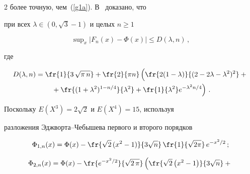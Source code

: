 \begin{multicols}{2}
более точную, чем~(\ref{g1a}). В~\cite{5-cr} доказано, что


при всех $\lambda \in (0,\sqrt{3}-1)$  и целых $n\geq 1$


$$\sup\nolimits_x |F_n(x) - \Phi(x)| \leq D(\lambda, n)\,,


$$


где





\noindent


\begin{multline} 


D(\lambda, n) = \fr{1}{3\,\sqrt{\pi\,n}} +


\fr{2}{\pi n}\left(


\vphantom{\fr{(1+\lambda^2)^{1-n/4}}{\lambda^2}}


\fr{2(1-\lambda)}{(2-2\lambda - \lambda^2)^2} +{}\right.\\


\left.{}+


\fr{(1+\lambda^2)^{1-n/4}}{\lambda^2} +


\fr{1}{\lambda^2}e^{-\lambda^2 n/4}


\right)\,.


\label{g2}


\end{multline}


Поскольку   $E(X^3) = 2\sqrt{2}$ и $E(X^4)=15$, используя


разложения Эджворта--Чебышева первого и второго порядков


\begin{equation}


\label{g2a} 


\Phi_{1,n}(x) = \Phi (x) - \fr{\sqrt{2}\,(x^2-1)}{3 \sqrt{n}}


\,\fr{1}{\sqrt{2\pi}}\, e^{-x^2/2}\,;


\end{equation}





\vspace*{-12pt}





\noindent


\begin{multline}


\Phi_{2,n}(x) = \Phi (x) -\fr{e^{-x^2/2}}{\sqrt{2\,\pi}}


\left( \fr{\sqrt{2}\left(x^2-1\right)}{3\sqrt{n}}+{}\right.\\



\end{multline}
\end{multicols}
